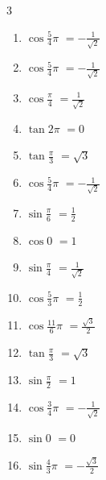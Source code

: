 \begin{multicols}{3}
\begin{enumerate}
  \item $\displaystyle \cos{\frac{5}{4}\pi}$
        $\displaystyle =-\frac{1}{\sqrt{2}}$

  \item $\displaystyle \cos{\frac{5}{4}\pi}$
        $\displaystyle =-\frac{1}{\sqrt{2}}$

  \item $\displaystyle \cos{\frac{\pi}{4}}$
        $\displaystyle =\frac{1}{\sqrt{2}}$

  \item $\displaystyle \tan{2\pi}$
        $\displaystyle =0$

  \item $\displaystyle \tan{\frac{\pi}{3}}$
        $\displaystyle =\sqrt{3}$

  \item $\displaystyle \cos{\frac{5}{4}\pi}$
        $\displaystyle =-\frac{1}{\sqrt{2}}$

  \item $\displaystyle \sin{\frac{\pi}{6}}$
        $\displaystyle =\frac{1}{2}$

  \item $\displaystyle \cos{0}$
        $\displaystyle =1$

  \item $\displaystyle \sin{\frac{\pi}{4}}$
        $\displaystyle =\frac{1}{\sqrt{2}}$

  \item $\displaystyle \cos{\frac{5}{3}\pi}$
        $\displaystyle =\frac{1}{2}$

  \item $\displaystyle \cos{\frac{11}{6}\pi}$
        $\displaystyle =\frac{\sqrt{3}}{2}$

  \item $\displaystyle \tan{\frac{\pi}{3}}$
        $\displaystyle =\sqrt{3}$

  \item $\displaystyle \sin{\frac{\pi}{2}}$
        $\displaystyle =1$

  \item $\displaystyle \cos{\frac{3}{4}\pi}$
        $\displaystyle =-\frac{1}{\sqrt{2}}$

\columnbreak %

\resetques

  \item $\displaystyle \sin{0}$
        $\displaystyle =0$

  \item $\displaystyle \sin{\frac{4}{3}\pi}$
        $\displaystyle =-\frac{\sqrt{3}}{2}$


\end{enumerate}
\end{multicols}
